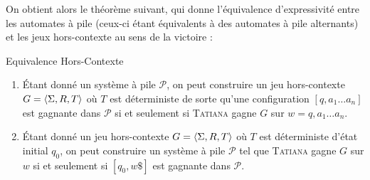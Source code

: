 \documentclass{cours}
\begin{document}
On obtient alors le théorème suivant, qui donne l'équivalence d'expressivité entre les automates à pile (ceux-ci étant équivalents à des automates à pile alternants) et les jeux hors-contexte au sens de la victoire : 
\begin{théorème}{Equivalence Hors-Contexte}{}
    \begin{enumerate}
        \item Étant donné un système à pile $\mathcal{P}$, on peut construire un jeu hors-contexte $G = \left\langle \Sigma, R, T \right\rangle$ où $T$ est déterministe de sorte qu'une configuration $\left[q, a_{1}\ldots a_{n}\right]$ est gagnante dans $\mathcal{P}$ si et seulement si \textsc{Tatiana} gagne $G$ sur $w = q,a_{1}\ldots a_{n}$. 
        \item Étant donné un jeu hors-contexte $G = \left\langle \Sigma, R, T \right\rangle$ où $T$ est déterministe d'état initial $q_{0}$, on peut construire un système à pile $\mathcal{P}$ tel que \textsc{Tatiana} gagne $G$ sur $w$ si et seulement si $\left[q_{0}, w\$\right]$ est gagnante dans $\mathcal{P}$.
    \end{enumerate}
\end{théorème}
\end{document}
